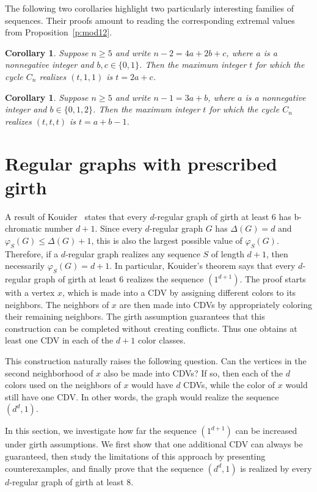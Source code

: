 \documentclass{article}
\newtheorem{corollary}[theorem]{Corollary}
\theoremstyle{definition}
\begin{document}
The following two corollaries highlight two particularly interesting families of sequences. Their proofs amount to reading the corresponding extremal values from Proposition~\ref{p:mod12}.

\begin{corollary}
Suppose $n\geq5$ and write $n-2=4a+2b+c$, where $a$ is a nonnegative integer and $b,c\in\{0,1\}$. Then the maximum integer $t$ for which the cycle $C_n$ realizes $(t,1,1)$ is $t=2a+c$.
\end{corollary}

\begin{corollary}
Suppose $n\geq5$ and write $n-1=3a+b$, where $a$ is a nonnegative integer and $b\in\{0,1,2\}$. Then the maximum integer $t$ for which the cycle $C_n$ realizes $(t,t,t)$ is $t=a+b-1$.
\end{corollary}

\section{Regular graphs with prescribed girth}\label{s:reg}

A result of Kouider~\cite{Koui-04}
states that every $d$-regular graph of girth at least $6$ has b-chromatic number $d+1$. Since every $d$-regular graph $G$ has $\Delta(G)=d$ and $\varphi_S(G)\leq\Delta(G)+1$, this is also the largest possible value of $\varphi_S(G)$. Therefore, if a $d$-regular graph realizes any sequence $S$ of length $d+1$, then necessarily $\varphi_S(G)=d+1$. In particular, Kouider's theorem says that every $d$-regular graph of girth at least $6$ realizes the sequence $(1^{d+1})$. The proof starts with a vertex $x$, which is made into a CDV by assigning different colors to its neighbors. The neighbors of $x$ are then made into CDVs by appropriately coloring their remaining neighbors. The girth assumption guarantees that this construction can be completed without creating conflicts. Thus one obtains at least one CDV in each of the $d+1$ color classes.

This construction naturally raises the following question. Can the vertices in the second neighborhood of $x$ also be made into CDVs? If so, then each of the $d$ colors used on the neighbors of $x$ would have $d$ CDVs, while the color of $x$ would still have one CDV. In other words, the graph would realize the sequence $(d^d,1)$.

In this section, we investigate how far the sequence $(1^{d+1})$ can be increased under girth assumptions. We first show that one additional CDV can always be guaranteed, then study the limitations of this approach by presenting counterexamples, and finally prove that the sequence $(d^d,1)$ is realized by every $d$-regular graph of girth at least $8$.
\end{document}
